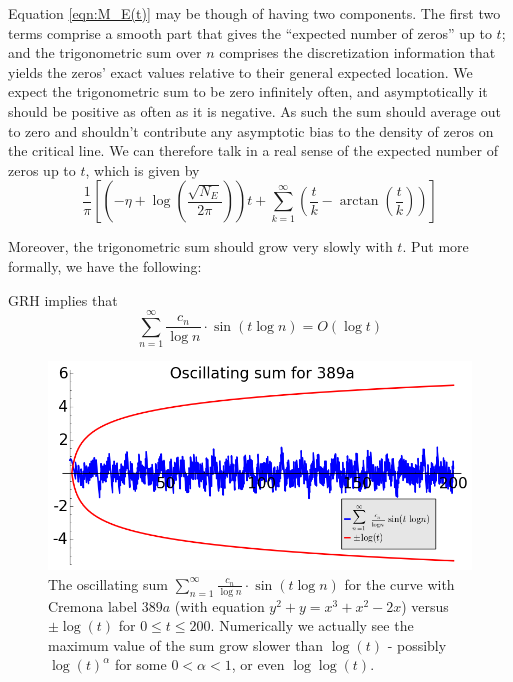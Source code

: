 Equation \ref{eqn:M_E(t)} may be though of having two components. The first two terms comprise a smooth part that gives the ``expected number of zeros'' up to $t$; and the trigonometric sum over $n$ comprises the discretization information that yields the zeros' exact values relative to their general expected location. We expect the trigonometric sum to be zero infinitely often, and asymptotically it should be positive as often as it is negative. As such the sum should average out to zero and shouldn't contribute any asymptotic bias to the density of zeros on the critical line. We can therefore talk in a real sense of the expected number of zeros up to $t$, which is given by
\begin{equation}\label{eqn:M_E_smooth_part}
\frac{1}{\pi}\left[\left(-\eta+\log\left(\frac{\sqrt{N_E}}{2\pi}\right)\right) t + \sum_{k=1}^{\infty} \left(\frac{t}{k} - \arctan\left(\frac{t}{k}\right)\right)\right]
\end{equation}

Moreover, the trigonometric sum should grow very slowly with $t$. Put more formally, we have the following:
\begin{conjecture}[GRH]\label{conj:trig_sum_size}
GRH implies that
\begin{equation}
\sum_{n=1}^{\infty} \frac{c_n}{\log n}\cdot \sin(t\log n) = O(\log t)
\end{equation}
\end{conjecture}

\begin{figure}[!h]
    \centering
    \includegraphics[width=1.0\textwidth]{graphics/M_E_trig_sum_bounds.png}
    \caption{The oscillating sum $\sum_{n=1}^{\infty} \frac{c_n}{\log n}\cdot \sin(t\log n)$ for the curve with Cremona label $389a$ (with equation $y^2 + y = x^3 + x^2 - 2x$) versus $\pm \log(t)$ for $0\le t \le 200$. Numerically we actually see the maximum value of the sum grow slower than $\log(t)$ - possibly $\log(t)^{\alpha}$ for some $0<\alpha<1$, or even $\log\log(t)$.}
    \label{fig:M_E_trig_sum_bounds}
\end{figure}

